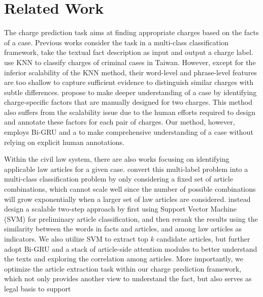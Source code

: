 \section{Related Work}
\label{sec_related_work}
The charge prediction task aims at finding appropriate charges based on the facts of a case. Previous works consider the task in a multi-class classification framework, take the textual fact description as input and output a charge label. 
\cite{LIU2004case,liu2006exploring} use KNN to classify charges of criminal cases in Taiwan. However, except for the inferior scalability of the KNN method, their word-level and phrase-level features are too shallow to capture  sufficient evidence to distinguish similar charges with subtle differences. 
\cite{lin2012exploiting} propose to make deeper understanding of a case by identifying charge-specific factors that are manually designed for two charges. This method also suffers from the scalability issue due to the human efforts required to design and annotate these factors for each pair of charges. Our method, however, employs Bi-GRU and a  to make comprehensive understanding of a case without relying on explicit human annotations. 

Within the civil law system,
there are also works focusing on identifying applicable law articles for a given case. 
\cite{liu2005classifying,liu2006exploring} convert this multi-label problem into a multi-class classification problem by only considering a fixed set of article combinations, which cannot scale well since the number of possible combinations will grow exponentially when a larger set of law articles are considered.
\cite{liu2015predicting} instead design a scalable two-step approach %
by first using Support Vector Machine (SVM) for preliminary article classification, and then 
rerank the results using the similarity between the words in facts and articles, and  among law articles as indicators.
We also utilize SVM to extract top $k$ candidate articles, but further adopt Bi-GRU and a stack of article-side attention modules to better understand the texts and exploring the correlation among articles. 
More importantly, we optimize the article extraction task within our charge prediction framework,  which not only provides another view to understand the fact, but also serves as legal basis to support 

